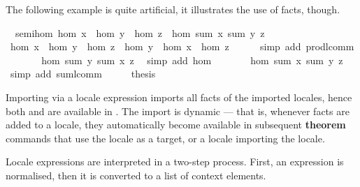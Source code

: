 \begin{isabellebody}
\begin{isamarkuptext}
  The following example is quite artificial, it illustrates the use of
  facts, though.%
\end{isamarkuptext}%
\isamarkuptrue%
\ {\isacharparenleft}\ semi{\isacharunderscore}hom{\isacharparenright}\ {\isachardoublequote}hom\ x\ {\isasymcdot}\ {\isacharparenleft}hom\ y\ {\isasymcdot}\ hom\ z{\isacharparenright}\ {\isacharequal}\ hom\ {\isacharparenleft}sum\ x\ {\isacharparenleft}sum\ y\ z{\isacharparenright}{\isacharparenright}{\isachardoublequote}\isanewline
\isamarkupfalse%
\ {\isacharminus}\isanewline
\ \ \isamarkupfalse%
\ {\isachardoublequote}hom\ x\ {\isasymcdot}\ {\isacharparenleft}hom\ y\ {\isasymcdot}\ hom\ z{\isacharparenright}\ {\isacharequal}\ hom\ y\ {\isasymcdot}\ {\isacharparenleft}hom\ x\ {\isasymcdot}\ hom\ z{\isacharparenright}{\isachardoublequote}\isanewline
\ \ \ \ \isamarkupfalse%
\ {\isacharparenleft}simp\ add{\isacharcolon}\ prod{\isachardot}lcomm{\isacharparenright}\isanewline
\ \ \isamarkupfalse%
\ \isamarkupfalse%
\ {\isachardoublequote}{\isasymdots}\ {\isacharequal}\ hom\ {\isacharparenleft}sum\ y\ {\isacharparenleft}sum\ x\ z{\isacharparenright}{\isacharparenright}{\isachardoublequote}\ \isamarkupfalse%
\ {\isacharparenleft}simp\ add{\isacharcolon}\ hom{\isacharparenright}\isanewline
\ \ \isamarkupfalse%
\ \isamarkupfalse%
\ {\isachardoublequote}{\isasymdots}\ {\isacharequal}\ hom\ {\isacharparenleft}sum\ x\ {\isacharparenleft}sum\ y\ z{\isacharparenright}{\isacharparenright}{\isachardoublequote}\ \isamarkupfalse%
\ {\isacharparenleft}simp\ add{\isacharcolon}\ sum{\isachardot}lcomm{\isacharparenright}\isanewline
\ \ \isamarkupfalse%
\ \isamarkupfalse%
\ {\isacharquery}thesis\ \isamarkupfalse%
\isacommand{{\isachardot}}\isanewline
\isamarkupfalse%
\isamarkupfalse%
%
\begin{isamarkuptext}%
Importing via a locale expression imports all facts of
  the imported locales, hence both  and  are
  available in .  The import is dynamic --- that is,
  whenever facts are added to a locale, they automatically
  become available in subsequent \textbf{theorem} commands that use
  the locale as a target, or a locale importing the locale.%
\end{isamarkuptext}%
\isamarkuptrue%
%
\isamarkuptrue%
%
\label{sec-normal-forms}
\newcommand{\I}{\mathcal{I}}
\newcommand{\F}{\mathcal{F}}
\newcommand{\N}{\mathcal{N}}
\newcommand{\C}{\mathcal{C}}
\newcommand{\App}{\mathbin{\overline{@}}}
%
\begin{isamarkuptext}%
Locale expressions are interpreted in a two-step process.  First, an
  expression is normalised, then it is converted to a list of context
  elements.


\end{isamarkuptext}
\end{isabellebody}
